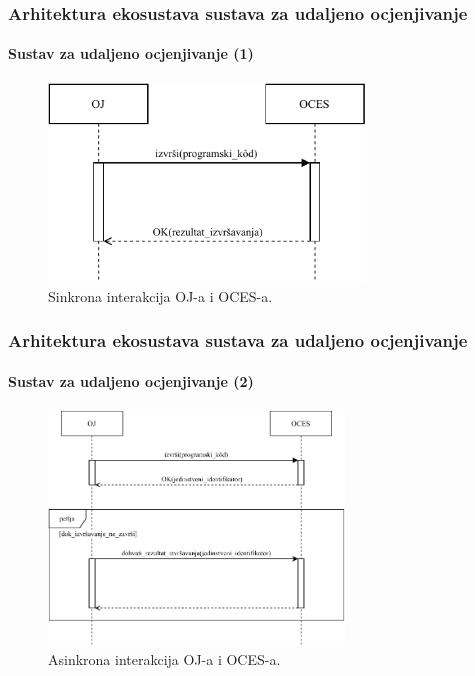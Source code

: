 \documentclass{beamer}
\newif\ifplacelogo
\begin{document}
\begin{frame}
\frametitle{Arhitektura ekosustava sustava za udaljeno ocjenjivanje}
\framesubtitle{Sustav za udaljeno ocjenjivanje (1)}
\begin{figure}[htb]
	\centering
	\includegraphics[width=0.75\textwidth]{images/Sync Interakcija.pdf}
	\caption{
		Sinkrona interakcija OJ-a i OCES-a.
	}
\end{figure}
\end{frame}

\begin{frame}
\frametitle{Arhitektura ekosustava sustava za udaljeno ocjenjivanje}
\framesubtitle{Sustav za udaljeno ocjenjivanje (2)}
\begin{figure}[htb]
	\centering
	\includegraphics[width=0.7\textwidth]{images/Async Interakcija.pdf}
	\caption{
		Asinkrona interakcija OJ-a i OCES-a.
	}
\end{figure}
\end{frame}

\end{document}
